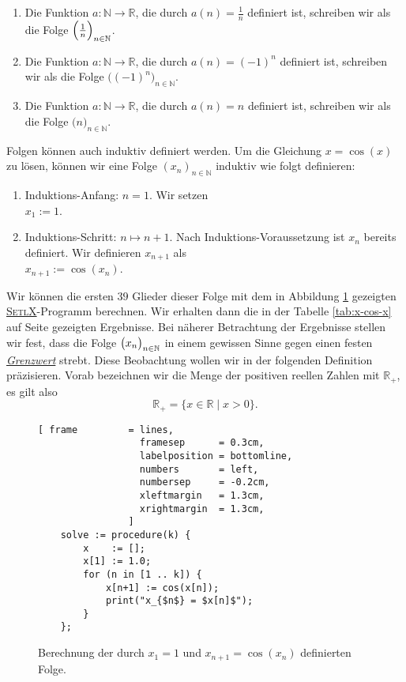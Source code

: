 \examples
\begin{enumerate}
\item Die Funktion $a:\mathbb{N} \rightarrow \mathbb{R}$, die durch  
      $a(n) = \frac{1}{n}$ definiert ist, schreiben wir als die Folge
      $\Bigl(\frac{1}{n}\Bigr)_{n\in\mathbb{N}}$.
\item Die Funktion $a:\mathbb{N} \rightarrow \mathbb{R}$, die durch  
      $a(n) = (-1)^n$ definiert ist, schreiben wir als die Folge
      $\bigl((-1)^n\bigr)_{n\in\mathbb{N}}$.
\item Die Funktion $a:\mathbb{N} \rightarrow \mathbb{R}$, die durch  
      $a(n) = n$ definiert ist, schreiben wir als die Folge
      $\bigl(n\bigr)_{n\in\mathbb{N}}$. 
\end{enumerate}
Folgen k\"onnen auch induktiv definiert werden.  Um die Gleichung $x = \cos(x)$ zu l\"osen,
k\"onnen wir eine Folge $(x_n)_{n\in\mathbb{N}}$ induktiv wie folgt definieren:
\begin{enumerate}
\item Induktions-Anfang: $n = 1$.  Wir setzen
      \\[0.2cm]
      \hspace*{1.3cm}
      $x_1 := 1$.
\item Induktions-Schritt: $n \mapsto n+1$.  Nach Induktions-Voraussetzung ist $x_n$ bereits
      definiert.  Wir definieren $x_{n+1}$ als
      \\[0.2cm]
      \hspace*{1.3cm}
      $x_{n+1} := \cos(x_n)$. \eod
\end{enumerate}
Wir k\"onnen die ersten $39$ Glieder dieser Folge mit dem in Abbildung
\ref{fig:solve.stlx} gezeigten \href{http://randoom.org/Software/SetlX}{\textsc{SetlX}}-Programm
berechnen. Wir erhalten dann  
die in der  Tabelle \ref{tab:x-cos-x} auf Seite \pageref{tab:x-cos-x} 
gezeigten Ergebnisse.  Bei n\"aherer Betrachtung der Ergebnisse stellen wir fest,
dass die Folge $\bigl(x_n\bigr)_{n\in\mathbb{N}}$ in einem gewissen Sinne gegen einen festen
\href{http://de.wikipedia.org/wiki/Grenzwert_(Folge)}{\emph{Grenzwert}} strebt.   
Diese Beobachtung wollen wir in der folgenden Definition
pr\"azisieren.  Vorab 
bezeichnen wir  die Menge der positiven reellen Zahlen mit $\mathbb{R}_+$, es gilt also
\[ \mathbb{R}_+ = \bigl\{ x \in \mathbb{R} \mid x > 0 \bigl\}. \]


\begin{figure}[!ht]
  \centering
\begin{Verbatim}[ frame         = lines, 
                  framesep      = 0.3cm, 
                  labelposition = bottomline,
                  numbers       = left,
                  numbersep     = -0.2cm,
                  xleftmargin   = 1.3cm,
                  xrightmargin  = 1.3cm,
                ]
    solve := procedure(k) {
        x    := []; 
        x[1] := 1.0;
        for (n in [1 .. k]) {
            x[n+1] := cos(x[n]);
            print("x_{$n$} = $x[n]$");
        }
    };
\end{Verbatim}
\vspace*{-0.3cm}
  \caption{Berechnung der durch  $x_1 = 1$ und $x_{n+1} = \cos(x_n)$ definierten Folge.}
  \label{fig:solve.stlx}
\end{figure} %

